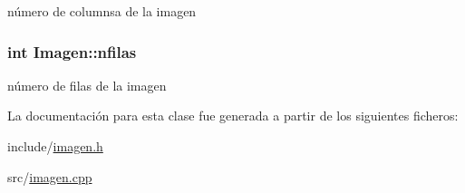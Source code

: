 número de columnsa de la imagen 

\hypertarget{class_imagen_a89599a9692fbe4cb60ee16c0a30a64ef}{}
\subsubsection[{nfilas}]{\setlength{\rightskip}{0pt plus 5cm}int Imagen\+::nfilas\hspace{0.3cm}{\ttfamily [private]}}\label{class_imagen_a89599a9692fbe4cb60ee16c0a30a64ef}


número de filas de la imagen 



La documentación para esta clase fue generada a partir de los siguientes ficheros\+:\begin{DoxyCompactItemize}
\item 
include/\hyperlink{imagen_8h}{imagen.\+h}\item 
src/\hyperlink{imagen_8cpp}{imagen.\+cpp}\end{DoxyCompactItemize}
